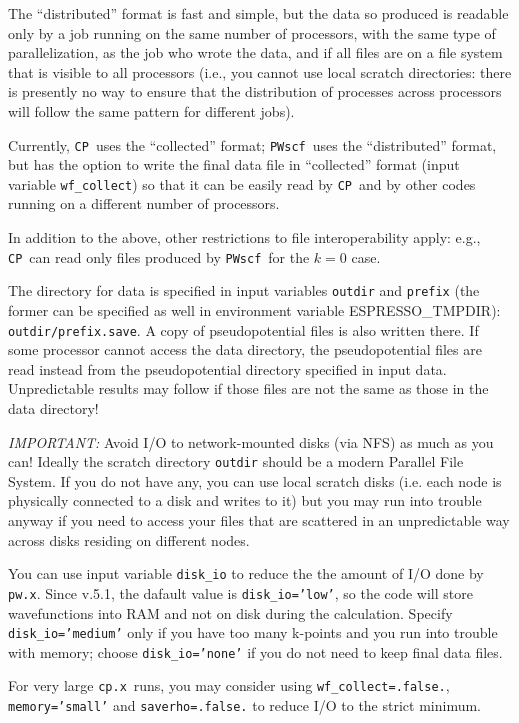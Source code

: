 \documentclass[12pt,a4paper]{article}
\def\pwx{\texttt{pw.x}}
\def\cpx{\texttt{cp.x}}
\def\PWscf{\texttt{PWscf}}
\def\CP{\texttt{CP}}
\begin{document}
The ``distributed'' format is fast and simple,
but the data so produced is readable only by 
a job running on the same number of processors,
with the same type of parallelization, as the
job who wrote the data, and if all 
files are on a file system that is visible to all
processors (i.e., you cannot use local scratch
directories: there is presently no way to ensure 
that the distribution of processes across
processors will follow the same pattern 
for different jobs). 

Currently, \CP\ uses the ``collected'' format;
\PWscf\ uses the ``distributed'' format, but 
has the option to write the final data file in 
``collected'' format (input variable \texttt{wf\_collect})
so that it can be easily read by \CP\ and by other
codes running on a different  number of processors.

In addition to the above, other restrictions to file
interoperability apply: e.g., \CP\ can read only files
produced by \PWscf\ for the $k=0$ case. 

The directory for data is specified in input variables
\texttt{outdir} and \texttt{prefix} (the former can be specified
as well in environment variable ESPRESSO\_TMPDIR):
\texttt{outdir/prefix.save}. A copy of pseudopotential files
is also written there. If some processor cannot access the
data directory, the pseudopotential files are read instead
from the pseudopotential directory specified in input data.
Unpredictable results may follow if those files
are not the same as those in the data directory!

{\em IMPORTANT:}
Avoid I/O to network-mounted disks (via NFS) as much as you can! 
Ideally the scratch directory \texttt{outdir} should be a modern 
Parallel File System. If you do not have any, you can use local
scratch disks (i.e. each node is physically connected to a disk
and writes to it) but you may run into trouble anyway if you 
need to access your files that are scattered in an unpredictable
way across disks residing on different nodes.

You can use input variable \texttt{disk\_io} to reduce the the
amount of I/O done by \pwx. Since v.5.1, the dafault value is 
\texttt{disk\_io='low'}, so the code will store wavefunctions 
into RAM and not on disk during the calculation. Specify
\texttt{disk\_io='medium'} only if you have too many k-points 
and you run into trouble with memory; choose \texttt{disk\_io='none'} 
if you do not need to keep final data files. 

For very large \cpx\ runs, you may consider using 
\texttt{wf\_collect=.false.}, \texttt{memory='small'} and
\texttt{saverho=.false.} to reduce I/O to the strict minimum.
\end{document}
